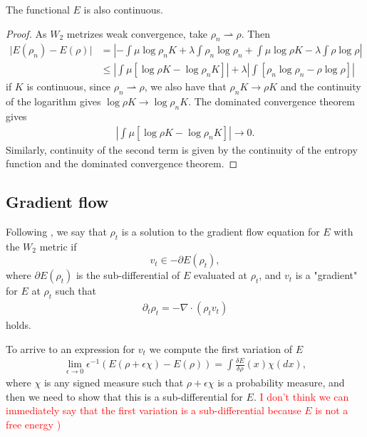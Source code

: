 \documentclass[a4paper]{article}
\theoremstyle{definition}
\begin{document}
The functional $E$ is also continuous.
\begin{proof}
As $W_2$ metrizes weak convergence, take $\rho_n \rightharpoonup \rho$. Then
\begin{align*}
\vert E(\rho_n) - E(\rho)\vert &= \left\lvert -\int\mu\log\rho_n K+\lambda\int\rho_n\log\rho_n +\int\mu\log\rho K-\lambda\int\rho\log\rho\right\rvert\\
&\leq  \left\lvert \int\mu\left[\log\rho K - \log\rho_n K \right]\right\rvert +\lambda\left\lvert\int\left[ \rho_n\log\rho_n -\rho\log\rho\right]\right\rvert
\end{align*}
if $K$ is continuous, since $\rho_n \rightharpoonup \rho$, we also have that $\rho_n K \rightarrow \rho K$ and the continuity of the logarithm gives $\log\rho K \rightarrow\log\rho_n K$. The dominated convergence theorem gives
\begin{align*}
\left\lvert \int\mu\left[\log\rho K - \log\rho_n K \right]\right\rvert \rightarrow 0.
\end{align*}
Similarly, continuity of the second term is given by the continuity of the entropy function and the dominated convergence theorem.
\end{proof}

\subsection{Gradient flow}
Following \citet[Definition 11.1.1]{ambrosio2008gradient}, we say that $\rho_t$ is a solution to the gradient flow equation for $E$ with the $W_2$ metric if
\begin{equation*}
v_t \in -\partial E(\rho_t),
\end{equation*}
where $\partial E(\rho_t)$ is the sub-differential of $E$ evaluated at $\rho_t$, and $v_t$ is a "gradient" for $E$ at $\rho_t$ such that
\begin{align*}
\partial_{t}\rho_{t}=-\nabla\cdot\left(\rho_{t}v_t\right)
\end{align*} 
holds.

To arrive to an expression for $v_t$ we compute the first variation of $E$
\begin{align*}
\lim_{\epsilon\rightarrow0}\epsilon^{-1}\left(E(\rho+\epsilon\chi)-E(\rho)\right)=\int\frac{\delta E}{\delta\rho}\left(x\right)\chi\left(dx\right),
\end{align*}
where $\chi$ is any signed measure such that $\rho+\epsilon\chi$ is a probability measure, and then we need to show that this is a sub-differential for $E$.
\textcolor{red}{I don't think we can immediately say that the first variation is a sub-differential because $E$ is not a free energy \citep[Lemma 8-10]{carrillo2006contractions})}
\end{document}
